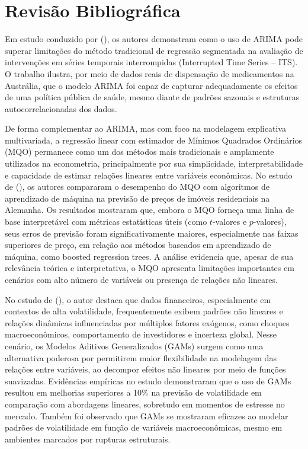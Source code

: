 \documentclass[	12pt, Times, openright, oneside, a4paper, english, brazil]{abntex2}
\begin{document}

% 


\chapter{Revisão Bibliográfica}

Em estudo conduzido por \citeauthor{Schaffer2021Interrupted} (\citeyear{Schaffer2021Interrupted}), os autores demonstram como o uso de ARIMA pode superar limitações do método tradicional de regressão segmentada na avaliação de intervenções em séries temporais interrompidas (Interrupted Time Series – ITS). O trabalho ilustra, por meio de dados reais de dispensação de medicamentos na Austrália, que o modelo ARIMA foi capaz de capturar adequadamente os efeitos de uma política pública de saúde, mesmo diante de padrões sazonais e estruturas autocorrelacionadas dos dados.

De forma complementar ao ARIMA, mas com foco na modelagem explicativa multivariada, a regressão linear com estimador de Mínimos Quadrados Ordinários (MQO) permanece como um dos métodos mais tradicionais e amplamente utilizados na econometria, principalmente por sua simplicidade, interpretabilidade e capacidade de estimar relações lineares entre variáveis econômicas. No estudo de \citeauthor{Hoang2022Machine} (\citeyear{Hoang2022Machine}), os autores compararam o desempenho do MQO com algoritmos de aprendizado de máquina na previsão de preços de imóveis residenciais na Alemanha. Os resultados mostraram que, embora o MQO forneça uma linha de base interpretável com métricas estatísticas úteis (como $t$-valores e $p$-valores), seus erros de previsão foram significativamente maiores, especialmente nas faixas superiores de preço, em relação aos métodos baseados em aprendizado de máquina, como boosted regression trees. A análise evidencia que, apesar de sua relevância teórica e interpretativa, o MQO apresenta limitações importantes em cenários com alto número de variáveis ou presença de relações não lineares.

No estudo de \citeauthor{Zhang2025Impact} (\citeyear{Zhang2025Impact}), o autor destaca que dados financeiros, especialmente em contextos de alta volatilidade, frequentemente exibem padrões não lineares e relações dinâmicas influenciadas por múltiplos fatores exógenos, como choques macroeconômicos, comportamento de investidores e incerteza global. Nesse cenário, os Modelos Aditivos Generalizados (GAMs) surgem como uma alternativa poderosa por permitirem maior flexibilidade na modelagem das relações entre variáveis, ao decompor efeitos não lineares por meio de funções suavizadas. Evidências empíricas no estudo demonstraram que o uso de GAMs resultou em melhorias superiores a 10\% na previsão de volatilidade em comparação com abordagens lineares, sobretudo em momentos de estresse no mercado. Também foi observado que GAMs se mostraram eficazes ao modelar padrões de volatilidade em função de variáveis macroeconômicas, mesmo em ambientes marcados por rupturas estruturais. 
\end{document}
